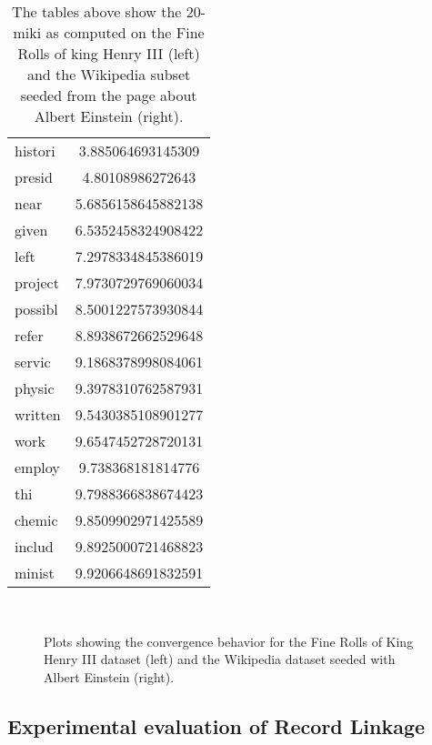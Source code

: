 \begin{table}
\begin{minipage}{.5\textwidth}
\begin{tabular}{l S[round-precision=4]}
    		histori & 3.885064693145309\\
    		presid & 4.80108986272643\\
    		near & 5.6856158645882138\\
    		given & 6.5352458324908422\\
    		left & 7.2978334845386019\\
    		project & 7.9730729769060034\\
    		possibl & 8.5001227573930844\\
    		refer & 8.8938672662529648\\
    		servic & 9.1868378998084061\\
    		physic & 9.3978310762587931\\
    		written & 9.5430385108901277\\
    		work & 9.6547452728720131\\
    		employ & 9.738368181814776\\
    		thi & 9.7988366838674423\\
    		chemic & 9.8509902971425589\\
    		includ & 9.8925000721468823\\
    		minist & 9.9206648691832591\\
    		\bottomrule
    	\end{tabular}
    	\label{t:miki_wikipedia}
    \end{minipage}
    \caption{The tables above show the 20-miki as computed on the Fine Rolls of king Henry III (left) and the Wikipedia subset seeded from the page about Albert Einstein (right).}
\end{table}

\begin{figure}
    ~
    
    \caption{Plots showing the convergence behavior for the Fine Rolls of King Henry III dataset (left) and the Wikipedia dataset seeded with Albert Einstein (right).}\label{fig:1}
\end{figure}




\subsection{Experimental evaluation of Record Linkage}
\label{sec:record_linkage_evaluation}